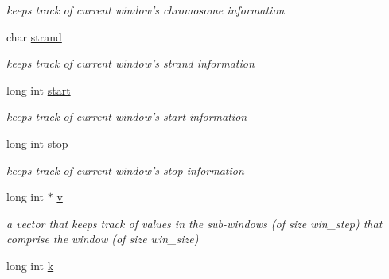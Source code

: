 \begin{DoxyCompactItemize}
\begin{DoxyCompactList}\small\item\em keeps track of current window's chromosome information \end{DoxyCompactList}\item 
\hypertarget{classGenomicRegionSetScanner_a0b9c57901528e75d9d32f4f98a708f4b}{
char \hyperlink{classGenomicRegionSetScanner_a0b9c57901528e75d9d32f4f98a708f4b}{strand}}
\label{classGenomicRegionSetScanner_a0b9c57901528e75d9d32f4f98a708f4b}

\begin{DoxyCompactList}\small\item\em keeps track of current window's strand information \end{DoxyCompactList}\item 
\hypertarget{classGenomicRegionSetScanner_a305a53be4686bb873996e83b3c393701}{
long int \hyperlink{classGenomicRegionSetScanner_a305a53be4686bb873996e83b3c393701}{start}}
\label{classGenomicRegionSetScanner_a305a53be4686bb873996e83b3c393701}

\begin{DoxyCompactList}\small\item\em keeps track of current window's start information \end{DoxyCompactList}\item 
\hypertarget{classGenomicRegionSetScanner_af39ff3f8e4f1a1ab55c004cd06c2378a}{
long int \hyperlink{classGenomicRegionSetScanner_af39ff3f8e4f1a1ab55c004cd06c2378a}{stop}}
\label{classGenomicRegionSetScanner_af39ff3f8e4f1a1ab55c004cd06c2378a}

\begin{DoxyCompactList}\small\item\em keeps track of current window's stop information \end{DoxyCompactList}\item 
\hypertarget{classGenomicRegionSetScanner_a19e26d0661ce5f380a72f3eb43b0b07f}{
long int $\ast$ \hyperlink{classGenomicRegionSetScanner_a19e26d0661ce5f380a72f3eb43b0b07f}{v}}
\label{classGenomicRegionSetScanner_a19e26d0661ce5f380a72f3eb43b0b07f}

\begin{DoxyCompactList}\small\item\em a vector that keeps track of values in the sub-\/windows (of size win\_\-step) that comprise the window (of size win\_\-size) \end{DoxyCompactList}\item 
\hypertarget{classGenomicRegionSetScanner_afa341bbfce6cffdc2880c8f1c80abeb1}{
long int \hyperlink{classGenomicRegionSetScanner_afa341bbfce6cffdc2880c8f1c80abeb1}{k}}
\label{classGenomicRegionSetScanner_afa341bbfce6cffdc2880c8f1c80abeb1}


\end{DoxyCompactItemize}
